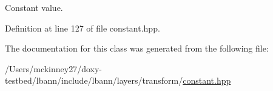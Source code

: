 Constant value. 

Definition at line 127 of file constant.\+hpp.



The documentation for this class was generated from the following file\+:\begin{DoxyCompactItemize}
\item 
/\+Users/mckinney27/doxy-\/testbed/lbann/include/lbann/layers/transform/\hyperlink{constant_8hpp}{constant.\+hpp}\end{DoxyCompactItemize}

